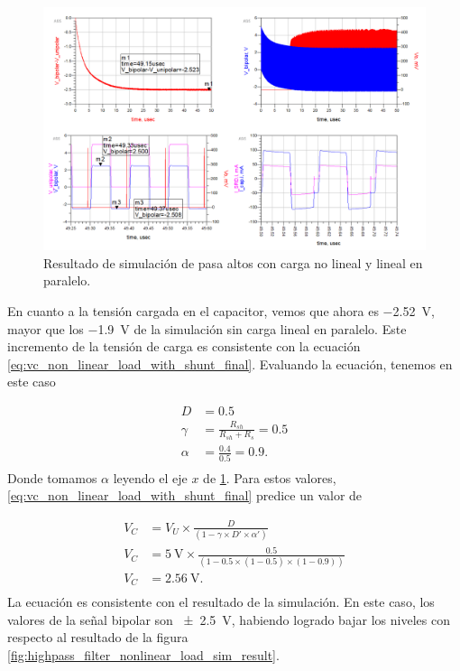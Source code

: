\begin{figure}[tbp]
    \centering
    \includegraphics[width=\textwidth]{images/highpass_nonlinear_w_shunt_sim_result.png}
    \caption{Resultado de simulación de pasa altos con carga no lineal y lineal
    en paralelo.}
    \label{fig:highpass_non_linear_w_shunt_simulation_result}
\end{figure}

En cuanto a la tensión cargada en el capacitor, vemos que ahora es
\qty{-2.52}{\volt}, mayor que los \qty{-1.9}{\volt} de la simulación sin carga
lineal en paralelo. Este incremento de la tensión de carga es consistente con la
ecuación \ref{eq:vc_non_linear_load_with_shunt_final}. Evaluando la ecuación,
tenemos en este caso

\begin{equation}
    \begin{aligned}
        D &= 0.5 \\
        \gamma &= \frac{R_{sh}}{R_{sh}+R_{s}} =0.5 \\
        \alpha &= \frac{0.4}{0.5} = 0.9. \\
    \end{aligned}
\end{equation}
Donde tomamos $\alpha$ leyendo el eje $x$ de
\ref{fig:highpass_non_linear_w_shunt_simulation_result}. Para estos valores,
\ref{eq:vc_non_linear_load_with_shunt_final} predice un valor de

\begin{equation}
    \begin{aligned}
        V_C &= V_U \times \frac{D}{\left( 1 - \gamma \times D' \times \alpha'\right)} \\
        V_C &= \qty{5}{\volt} \times \frac{0.5}{\left( 1 - 0.5 \times (1-0.5)
        \times (1-0.9) \right)} \\
        V_C &= \qty{2.56}{\volt}. \\
    \end{aligned}
\end{equation}
La ecuación es consistente con el resultado de la simulación. En este caso, los
valores de la señal bipolar son \qty{\pm2.5}{\volt}, habiendo logrado bajar los
niveles con respecto al resultado de la figura
\ref{fig:highpass_filter_nonlinear_load_sim_result}.

